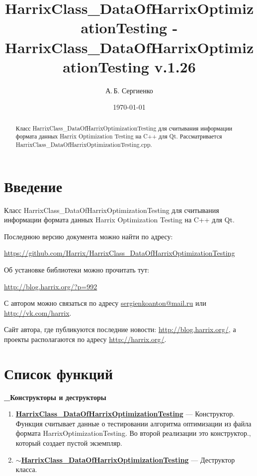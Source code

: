 \documentclass[a4paper,12pt]{article}
\title{Har\-rix\-Class\_Da\-ta\-Of\-Har\-rix\-Op\-ti\-mi\-za\-ti\-on\-Test\-ing - Har\-rix\-Class\_Da\-ta\-Of\-Har\-rix\-Op\-ti\-mi\-za\-ti\-on\-Test\-ing v.1.26}
\author{А.\,Б. Сергиенко}
\date{\today}
\begin{document}


\maketitle

\begin{abstract}
Класс HarrixClass\_DataOfHarrixOptimizationTesting для считывания информации формата данных Harrix Optimization Testing на C++ для Qt. Рассматривается HarrixClass\_DataOfHarrixOptimizationTesting.cpp.
\end{abstract}

\tableofcontents

\newpage

\section{Введение}

Класс HarrixClass\_DataOfHarrixOptimizationTesting для считывания информации формата данных Harrix Optimization Testing на C++ для Qt.

Последнюю версию документа можно найти по адресу:

\href{https://github.com/Harrix/HarrixClass\_DataOfHarrixOptimizationTesting}{https://github.com/Harrix/HarrixClass\_DataOfHarrixOptimizationTesting}

Об установке библиотеки можно прочитать тут:

\href{http://blog.harrix.org/?p=992}{http://blog.harrix.org/?p=992}

С автором можно связаться по адресу \href{mailto:sergienkoanton@mail.ru}{sergienkoanton@mail.ru} или  \href{http://vk.com/harrix}{http://vk.com/harrix}.

Сайт автора, где публикуются последние новости: \href{http://blog.harrix.org/}{http://blog.harrix.org/}, а проекты располагаются по адресу \href{http://harrix.org/}{http://harrix.org/}.

\newpage
\section{Список функций}\label{section_listfunctions}
\textbf{\_Конструкторы и деструкторы}
\begin{enumerate}

\item \textbf{\hyperref[HarrixClass_DataOfHarrixOptimizationTesting]{HarrixClass\_DataOfHarrixOptimizationTesting}} --- Конструктор. Функция считывает данные о тестировании алгоритма оптимизации из файла формата HarrixOptimizationTesting. Во второй реализации это конструктор., который создает пустой экземпляр.

\item \textbf{\hyperref[tildaHarrixClass_DataOfHarrixOptimizationTesting]{$\sim$HarrixClass\_DataOfHarrixOptimizationTesting}} --- Деструктор класса.

\end{enumerate}
\end{document}
